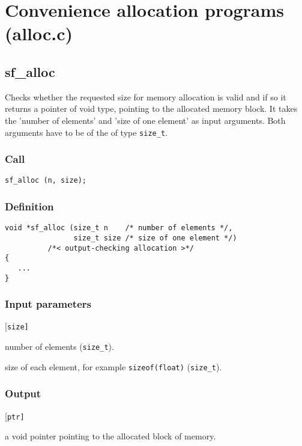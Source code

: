 \section{Convenience allocation programs (alloc.c)}




\subsection{{sf\_alloc}}\label{sec:sf_alloc}
Checks whether the requested size for memory allocation is valid and if so it returns a pointer of void type, pointing to the allocated memory block. It takes the 'number of elements' and 'size of one element' as input arguments. Both arguments have to be of the of type \texttt{size\_t}.

\subsubsection*{Call}
\begin{verbatim}sf_alloc (n, size);\end{verbatim}

\subsubsection*{Definition}
\begin{verbatim}
void *sf_alloc (size_t n    /* number of elements */, 
                size_t size /* size of one element */)
          /*< output-checking allocation >*/
{
   ...    
}
\end{verbatim}

\subsubsection*{Input parameters}
\begin{desclist}{\tt }{\quad}[\tt size]
   \setlength\itemsep{0pt}
   \item[n]	   number of elements (\texttt{size\_t}).
   \item[size] size of each element, for example \texttt{sizeof(float)} (\texttt{size\_t}).
\end{desclist}

\subsubsection*{Output}
\begin{desclist}{\tt }{\quad}[\tt ptr]
   \setlength\itemsep{0pt}
   \item[ptr] a void pointer pointing to the allocated block of memory.
\end{desclist}




